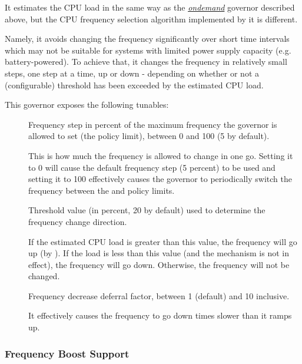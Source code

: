 \documentclass[a4paper,8pt,english]{sphinxmanual}
\begin{document}
It estimates the CPU load in the same way as the {\hyperref[admin\string-guide/pm/cpufreq:ondemand]{\emph{ondemand}}} governor described
above, but the CPU frequency selection algorithm implemented by it is different.

Namely, it avoids changing the frequency significantly over short time intervals
which may not be suitable for systems with limited power supply capacity (e.g.
battery-powered).  To achieve that, it changes the frequency in relatively
small steps, one step at a time, up or down - depending on whether or not a
(configurable) threshold has been exceeded by the estimated CPU load.

This governor exposes the following tunables:
\begin{description}
\item[{}] \leavevmode
Frequency step in percent of the maximum frequency the governor is
allowed to set (the  policy limit), between 0 and
100 (5 by default).

This is how much the frequency is allowed to change in one go.  Setting
it to 0 will cause the default frequency step (5 percent) to be used
and setting it to 100 effectively causes the governor to periodically
switch the frequency between the  and
 policy limits.

\item[{}] \leavevmode
Threshold value (in percent, 20 by default) used to determine the
frequency change direction.

If the estimated CPU load is greater than this value, the frequency will
go up (by ).  If the load is less than this value (and the
 mechanism is not in effect), the frequency will
go down.  Otherwise, the frequency will not be changed.

\item[{}] \leavevmode
Frequency decrease deferral factor, between 1 (default) and 10
inclusive.

It effectively causes the frequency to go down 
times slower than it ramps up.

\end{description}


\subsubsection{Frequency Boost Support}
\label{admin-guide/pm/cpufreq:frequency-boost-support}
\end{document}
